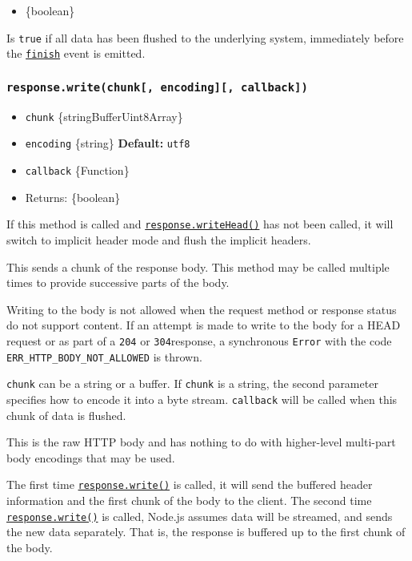 \begin{itemize}
\tightlist
\item
  \{boolean\}
\end{itemize}

Is \texttt{true} if all data has been flushed to the underlying system,
immediately before the
\hyperref[event-finish]{\texttt{\textquotesingle{}finish\textquotesingle{}}}
event is emitted.

\subsubsection{\texorpdfstring{\texttt{response.write(chunk{[},\ encoding{]}{[},\ callback{]})}}{response.write(chunk{[}, encoding{]}{[}, callback{]})}}\label{response.writechunk-encoding-callback}

\begin{itemize}
\tightlist
\item
  \texttt{chunk} \{string\textbar Buffer\textbar Uint8Array\}
\item
  \texttt{encoding} \{string\} \textbf{Default:}
  \texttt{\textquotesingle{}utf8\textquotesingle{}}
\item
  \texttt{callback} \{Function\}
\item
  Returns: \{boolean\}
\end{itemize}

If this method is called and
\hyperref[responsewriteheadstatuscode-statusmessage-headers]{\texttt{response.writeHead()}}
has not been called, it will switch to implicit header mode and flush
the implicit headers.

This sends a chunk of the response body. This method may be called
multiple times to provide successive parts of the body.

Writing to the body is not allowed when the request method or response
status do not support content. If an attempt is made to write to the
body for a HEAD request or as part of a \texttt{204} or
\texttt{304}response, a synchronous \texttt{Error} with the code
\texttt{ERR\_HTTP\_BODY\_NOT\_ALLOWED} is thrown.

\texttt{chunk} can be a string or a buffer. If \texttt{chunk} is a
string, the second parameter specifies how to encode it into a byte
stream. \texttt{callback} will be called when this chunk of data is
flushed.

This is the raw HTTP body and has nothing to do with higher-level
multi-part body encodings that may be used.

The first time
\hyperref[responsewritechunk-encoding-callback]{\texttt{response.write()}}
is called, it will send the buffered header information and the first
chunk of the body to the client. The second time
\hyperref[responsewritechunk-encoding-callback]{\texttt{response.write()}}
is called, Node.js assumes data will be streamed, and sends the new data
separately. That is, the response is buffered up to the first chunk of
the body.

